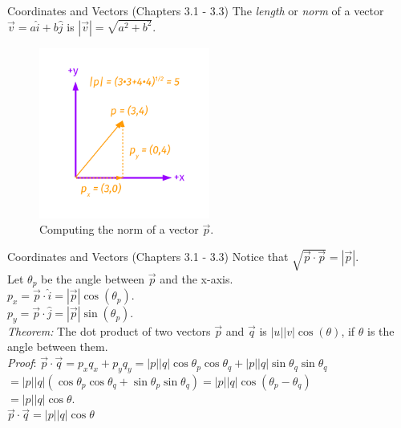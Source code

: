 \documentclass{beamer}
\begin{document}
\begin{frame}{Coordinates and Vectors (Chapters 3.1 - 3.3)}
The \textit{length} or \textit{norm} of a vector $\vec{v} = a\hat{i}+b\hat{j}$ is $|\vec{v}| = \sqrt{a^2+b^2}$.\\
\begin{figure}
\centering
\includegraphics[width=0.5\textwidth,trim=1cm 1cm 1cm 1cm,clip=true]{figures/Vectors7.pdf}
\caption{\label{fig:twovectors6} Computing the norm of a vector $\vec{p}$.}
\end{figure}
\end{frame}

\begin{frame}{Coordinates and Vectors (Chapters 3.1 - 3.3)}
Notice that $\sqrt{\vec{p}\cdot\vec{p}} = |\vec{p}|$.\\
Let $\theta_p$ be the angle between $\vec{p}$ and the x-axis.  \\
$p_{x} = \vec{p} \cdot \hat{i} = |\vec{p}| \cos(\theta_{p})$. \\
$p_{y} = \vec{p} \cdot \hat{j} = |\vec{p}| \sin(\theta_{p})$.\\
\vspace{0.5cm}
\textit{Theorem:} The dot product of two vectors $\vec{p}$ and $\vec{q}$ is $|u||v|\cos(\theta)$, if $\theta$ is the angle between them.\\
\vspace{0.5cm}
\textit{Proof}: $\vec{p}\cdot\vec{q} = p_{x}q_{x} + p_{y}q_{y} = |p||q|\cos\theta_p\cos\theta_q+|p||q|\sin\theta_q\sin\theta_q$ \\
$=|p||q|(\cos\theta_p\cos\theta_q+\sin\theta_p\sin\theta_q) = |p||q|\cos(\theta_p-\theta_q)$ \\
$=|p||q|\cos\theta$. \\
\vspace{0.1cm}
$\boxed{\vec{p}\cdot\vec{q}=|p||q|\cos\theta}$
\end{frame}
\end{document}

